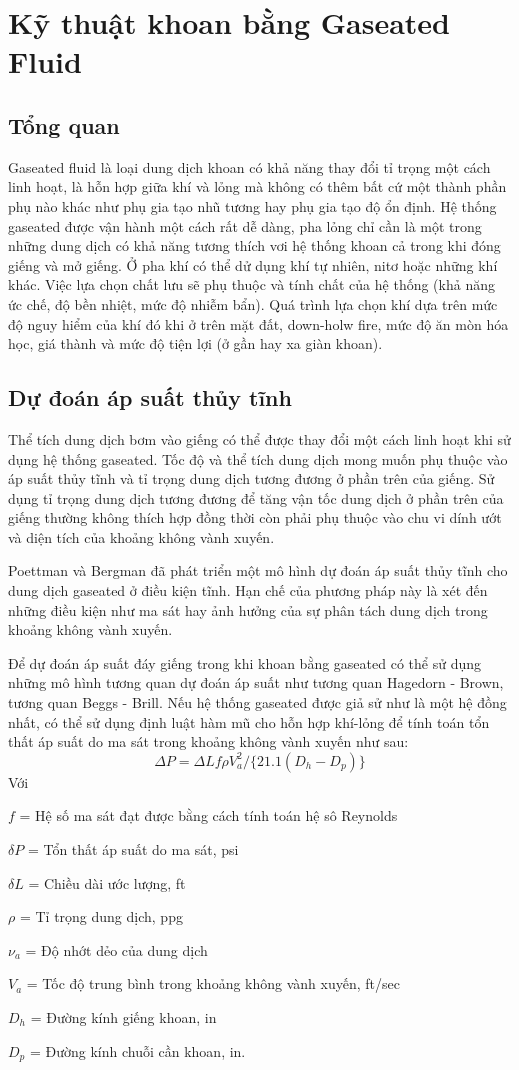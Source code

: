 \documentclass[13pt,a4paper]{article}
\begin{document}
\section{Kỹ thuật khoan bằng Gaseated Fluid}
\subsection{Tổng quan}
	Gaseated fluid là loại dung dịch khoan có khả năng thay đổi tỉ trọng một cách linh hoạt, là hỗn hợp giữa khí và lỏng mà không có thêm bất cứ một thành phần phụ nào khác như phụ gia tạo nhũ tương hay phụ gia tạo độ ổn định. Hệ thống gaseated được vận hành một cách rất dễ dàng, pha lỏng chỉ cần là một trong những dung dịch có khả năng tương thích vơi hệ thống khoan cả trong khi đóng giếng và mở giếng. Ở pha khí có thể dử dụng khí tự nhiên, nitơ hoặc những khí khác. Việc lựa chọn chất lưu sẽ phụ thuộc và tính chất của hệ thống (khả năng ức chế, độ bền nhiệt, mức độ nhiễm bẩn). Quá trình lựa chọn khí dựa trên mức độ nguy hiểm của khí đó khi ở trên mặt đất, down-holw fire, mức độ ăn mòn hóa học, giá thành và mức độ tiện lợi (ở gần hay xa giàn khoan).
\subsection{Dự đoán áp suất thủy tĩnh}
	Thể tích dung dịch bơm vào giếng có thể được thay đổi một cách linh hoạt khi sử dụng hệ thống gaseated. Tốc độ và thể tích dung dịch mong muốn phụ thuộc vào áp suất thủy tĩnh và tỉ trọng dung dịch tương đương ở phần trên của giếng. Sử dụng tỉ trọng dung dịch tương đương để tăng vận tốc dung dịch ở phần trên của giếng thường không thích hợp đồng thời còn phải phụ thuộc vào chu vi dính ướt và diện tích của khoảng không vành xuyến.\par
	Poettman và Bergman đã phát triển một mô hình dự đoán áp suất thủy tĩnh cho dung dịch gaseated ở điều kiện tĩnh. Hạn chế của phương pháp này là xét đến những điều kiện như ma sát hay ảnh hưởng của sự phân tách dung dịch trong khoảng không vành xuyến.\par
	Để dự đoán áp suất đáy giếng trong khi khoan bằng gaseated có thể sử dụng những mô hình tương quan dự đoán áp suất như tương quan Hagedorn - Brown, tương quan Beggs - Brill. Nếu hệ thống gaseated được giả sử như là một hệ đồng nhất, có thể sử dụng định luật hàm mũ cho hỗn hợp khí-lỏng để tính toán tổn thất áp suất do ma sát trong khoảng không vành xuyến như sau:
	\begin{equation}
	\Delta P = \Delta L f \rho V_a^2/\{21.1(D_h-D_p)\}
	\end{equation}
	Với \par
	$f$ = Hệ số ma sát đạt được bằng cách tính toán hệ sô Reynolds\par
	$\delta P$ = Tổn thất áp suất do ma sát, psi\par
	$\delta L$ = Chiều dài ước lượng, ft\par
	$\rho$ = Tỉ trọng dung dịch, ppg\par
	$\nu_a$ = Độ nhớt dẻo của dung dịch\par
	$V_a$ = Tốc độ trung bình trong khoảng không vành xuyến, ft/sec\par
	$D_h$ = Đường kính giếng khoan, in\par
	$D_p$ = Đường kính chuỗi cần khoan, in.
\end{document}
